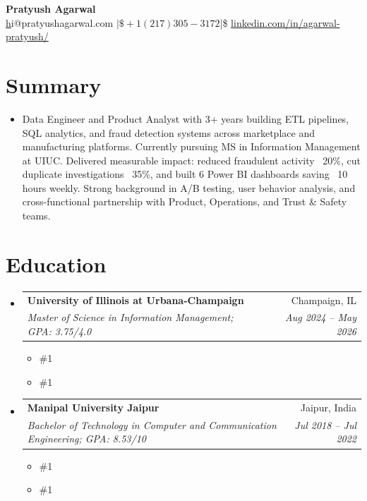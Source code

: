 \documentclass[letterpaper,11pt]{article}
\makeatletter
\newcommand{\resumeSubheading}[4]{
  \vspace{0pt}\item
    \begin{tabular*}{\textwidth}{l@{\extracolsep{\fill}}r}
      \textbf{#1} & #2 \\
      \textit{#3} & \textit{#4} \\ 
    \end{tabular*}\vspace{-6pt}
}
\newcommand{\resumeEducationCoursework}[1]{
  \vspace{-9pt} 
  \begin{itemize}[leftmargin=0pt, label={}]
    \item {\#1}
  \end{itemize}
}
\newcommand{\resumeEducationCertifications}[1]{
  \vspace{-15pt} 
  \begin{itemize}[leftmargin=0pt, label={}]
    \item {\#1}
  \end{itemize}
}
\newcommand{\resumeSubHeadingListStart}{\begin{itemize}[leftmargin=0pt,label={},itemsep=-2pt]}
\newcommand{\resumeSubHeadingListEnd}{\end{itemize}}
\makeatother
\begin{document}
\justifying

\begin{center}
    \textbf{\LARGE Pratyush Agarwal} \\ \vspace{5pt}
    \href{mailto:hi@pratyushagarwal.com}hi@pratyushagarwal.com $|\$ +1 (217) 305-3172 $|\$ \href{%
      https://linkedin.com/in/agarwal-pratyush/%
    }{%
      linkedin.com/in/agarwal-pratyush/%
    }
\end{center}

\section{Summary}
\begin{itemize}[leftmargin=0pt, label={}]
  \item { Data Engineer and Product Analyst with 3+ years building ETL pipelines, SQL analytics, and fraud detection systems across marketplace and manufacturing platforms. Currently pursuing MS in Information Management at UIUC. Delivered measurable impact: reduced fraudulent activity ~20\%, cut duplicate investigations ~35\%, and built 6 Power BI dashboards saving ~10 hours weekly. Strong background in A/B testing, user behavior analysis, and cross-functional partnership with Product, Operations, and Trust \& Safety teams. }
\end{itemize}

\section{Education}
  \resumeSubHeadingListStart
    \resumeSubheading
      {University of Illinois at Urbana-Champaign}{Champaign, IL}
      {Master of Science in Information Management; GPA: 3.75/4.0}{Aug 2024 -- May 2026}
      \resumeEducationCoursework{\textbf{Relevant Coursework:} Applied Machine Learning, Data Warehousing and Business Intelligence, Data Mining, Information Modeling, Data Visualization, Data and Statistical Models}
      \resumeEducationCertifications{\textbf{Certifications:} Getting Started with Microsoft Azure, Cloud Computing, The Complete Prompt Engineering for AI Bootcamp}

    \resumeSubheading
      {Manipal University Jaipur}{Jaipur, India}
      {Bachelor of Technology in Computer and Communication Engineering; GPA: 8.53/10}{Jul 2018 -- Jul 2022}
      \resumeEducationCoursework{\textbf{Relevant Coursework:} Data Structures and Algorithms, Relational Database Management Systems, Operating Systems, Computer Networks}
      \resumeEducationCertifications{\textbf{Certifications:} Certified Ethical Hacker (EC Council), Google Project Management Specialization}
  \resumeSubHeadingListEnd
\end{document}

